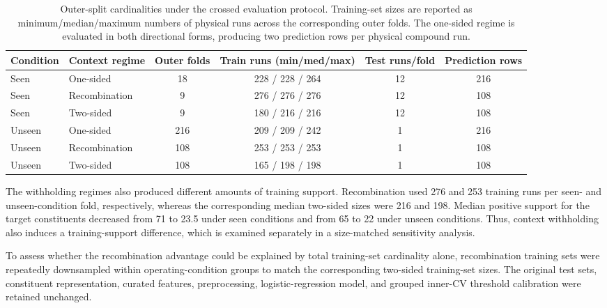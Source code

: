 \documentclass{ieeeaccess}
\begin{document}
\begin{table}[t]
\caption{Outer-split cardinalities under the crossed evaluation protocol.
Training-set sizes are reported as minimum/median/maximum numbers of physical
runs across the corresponding outer folds. The one-sided regime is evaluated
in both directional forms, producing two prediction rows per physical compound
run.}
\label{tab:protocol_cardinality}
\centering
\footnotesize
\begin{tabular}{llcccc}
\toprule
Condition &
Context regime &
Outer folds &
Train runs (min/med/max) &
Test runs/fold &
Prediction rows \\
\midrule

Seen & One-sided      & 18  & 228 / 228 / 264 & 12 & 216 \\
Seen & Recombination  & 9   & 276 / 276 / 276 & 12 & 108 \\
Seen & Two-sided      & 9   & 180 / 216 / 216 & 12 & 108 \\

\midrule

Unseen & One-sided      & 216 & 209 / 209 / 242 & 1 & 216 \\
Unseen & Recombination  & 108 & 253 / 253 / 253 & 1 & 108 \\
Unseen & Two-sided      & 108 & 165 / 198 / 198 & 1 & 108 \\

\bottomrule
\end{tabular}
\end{table}

The withholding regimes also produced different amounts of training support.
Recombination used 276 and 253 training runs per seen- and unseen-condition
fold, respectively, whereas the corresponding median two-sided sizes were
216 and 198. Median positive support for the target constituents decreased
from 71 to 23.5 under seen conditions and from 65 to 22 under unseen
conditions. Thus, context withholding also induces a training-support
difference, which is examined separately in a size-matched sensitivity analysis.

To assess whether the recombination advantage could be explained by total
training-set cardinality alone, recombination training sets were repeatedly
downsampled within operating-condition groups to match the corresponding
two-sided training-set sizes. The original test sets, constituent
representation, curated features, preprocessing, logistic-regression model,
and grouped inner-CV threshold calibration were retained unchanged.
\end{document}
